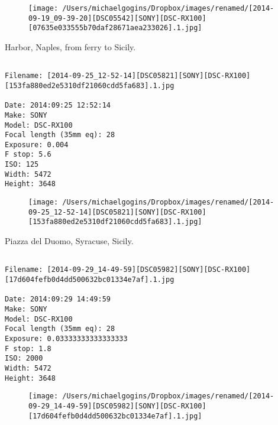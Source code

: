 \begin{figure}
\texttt{[image: /Users/michaelgogins/Dropbox/images/renamed/[2014-09-19\_09-39-20][DSC05542][SONY][DSC-RX100][07635e033555b70daf28671aea233026].1.jpg]}
\end{figure}
    
\clearpage
\onecolumn
\noindent Harbor, Naples, from ferry to Sicily.
\noindent
\begin{lstlisting}

Filename: [2014-09-25_12-52-14][DSC05821][SONY][DSC-RX100][153fa880ed2e5310df21060cdd5fa683].1.jpg

Date: 2014:09:25 12:52:14
Make: SONY
Model: DSC-RX100
Focal length (35mm eq): 28
Exposure: 0.004
F stop: 5.6
ISO: 125
Width: 5472
Height: 3648
\end{lstlisting}
\clearpage

\begin{figure}
\texttt{[image: /Users/michaelgogins/Dropbox/images/renamed/[2014-09-25\_12-52-14][DSC05821][SONY][DSC-RX100][153fa880ed2e5310df21060cdd5fa683].1.jpg]}
\end{figure}
    
\clearpage
\onecolumn
\noindent Piazza del Duomo, Syracuse, Sicily.
\noindent
\begin{lstlisting}

Filename: [2014-09-29_14-49-59][DSC05982][SONY][DSC-RX100][17d604fefb0d4dd500632bc01334e7af].1.jpg

Date: 2014:09:29 14:49:59
Make: SONY
Model: DSC-RX100
Focal length (35mm eq): 28
Exposure: 0.03333333333333333
F stop: 1.8
ISO: 2000
Width: 5472
Height: 3648
\end{lstlisting}
\clearpage

\begin{figure}
\texttt{[image: /Users/michaelgogins/Dropbox/images/renamed/[2014-09-29\_14-49-59][DSC05982][SONY][DSC-RX100][17d604fefb0d4dd500632bc01334e7af].1.jpg]}
\end{figure}
    
